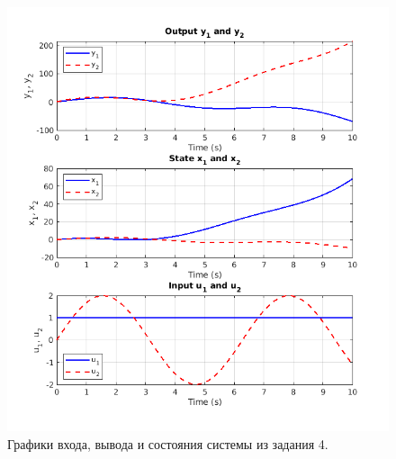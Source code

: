\begin{figure}[htbp]
    \centering
    \includegraphics[width=1\linewidth]{figs/task_4_out.png}
    \caption{Графики входа, вывода и состояния системы из задания 4.}
    \label{fig:task4_out}
\end{figure}